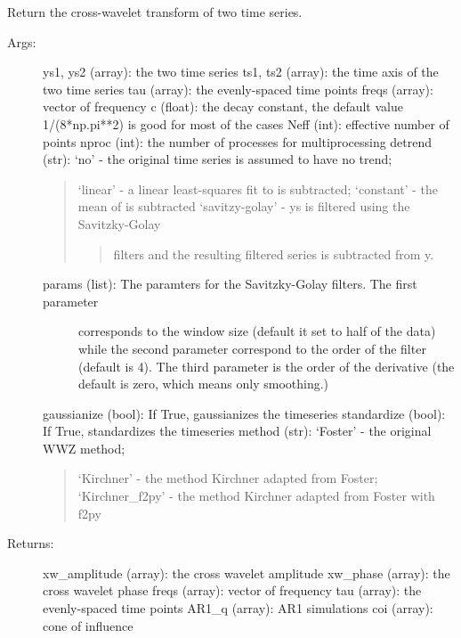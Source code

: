 \documentclass[letterpaper,10pt,english]{sphinxmanual}
\begin{document}
\begin{fulllineitems}
\label{\detokenize{Spectral:pyleoclim.Spectral.xwt}}
Return the cross-wavelet transform of two time series.
\begin{description}
\item[{Args:}] \leavevmode
ys1, ys2 (array): the two time series
ts1, ts2 (array): the time axis of the two time series
tau (array): the evenly-spaced time points
freqs (array): vector of frequency
c (float): the decay constant, the default value 1/(8*np.pi**2) is good for most of the cases
Neff (int): effective number of points
nproc (int): the number of processes for multiprocessing
detrend (str): ‘no’ - the original time series is assumed to have no trend;
\begin{quote}

‘linear’ - a linear least-squares fit to  is subtracted;
‘constant’ - the mean of  is subtracted
‘savitzy-golay’ - ys is filtered using the Savitzky-Golay
\begin{quote}

filters and the resulting filtered series is subtracted from y.
\end{quote}
\end{quote}
\begin{description}
\item[{params (list): The paramters for the Savitzky-Golay filters. The first parameter}] \leavevmode
corresponds to the window size (default it set to half of the data)
while the second parameter correspond to the order of the filter
(default is 4). The third parameter is the order of the derivative
(the default is zero, which means only smoothing.)

\end{description}

gaussianize (bool): If True, gaussianizes the timeseries
standardize (bool): If True, standardizes the timeseries
method (str): ‘Foster’ - the original WWZ method;
\begin{quote}

‘Kirchner’ - the method Kirchner adapted from Foster;
‘Kirchner\_f2py’ - the method Kirchner adapted from Foster with f2py
\end{quote}

\item[{Returns:}] \leavevmode
xw\_amplitude (array): the cross wavelet amplitude
xw\_phase (array): the cross wavelet phase
freqs (array): vector of frequency
tau (array): the evenly-spaced time points
AR1\_q (array): AR1 simulations
coi (array): cone of influence

\end{description}

\end{fulllineitems}
\end{document}
